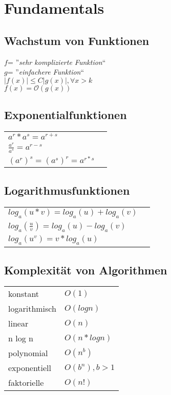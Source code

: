 \section{Fundamentals}

\subsection{Wachstum von Funktionen}
$ f $= ''\textit{sehr komplizierte Funktion}`` \\
$ g $= ''\textit{einfachere Funktion}`` \\
$ |f(x)| \leq C|g(x)|, \forall x > k $ \\
$ f(x) = \mathcal{O}(g(x)) $

\subsection{Exponentialfunktionen}
\begin{tabular}{ll}
    $ a^r * a^s = a^{r+s} $ \\
    $ \frac{a^r}{a^s} = a^{r-s} $ \\
    $ (a^r)^s = (a^s)^r = a^{r*s} $ \\
\end{tabular}

\subsection{Logarithmusfunktionen}
\begin{tabular}{ll}
    $ log_a(u * v) = log_a(u) + log_a(v) $ \\
    $ log_a(\frac{u}{v}) = log_a(u) - log_a(v) $ \\
    $ log_a(u^v) = v * log_a(u) $ \\
\end{tabular}

\subsection{Komplexität von Algorithmen}
\begin{tabular}{ll}
    konstant & $ O(1) $ \\
    logarithmisch & $ O(log n) $ \\ 
    linear & $ O(n) $ \\
    n log n & $ O(n * log n) $ \\
    polynomial & $ O(n^b) $ \\
    exponentiell & $ O(b^n), b > 1$ \\
    faktorielle & $ O(n!) $ \\
\end{tabular}


